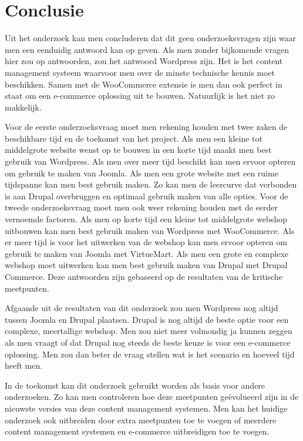 
\chapter{Conclusie}
\label{ch:conclusie}


Uit het onderzoek kan men concluderen dat dit geen onderzoeksvragen zijn waar men een eenduidig antwoord kan op geven. Als men zonder bijkomende vragen hier zou op antwoorden, zou het antwoord Wordpress zijn. Het is het content management systeem waarvoor men over de minste technische kennis moet beschikken. Samen met de WooCommerce extensie is men dan ook perfect in staat om een e-commerce oplossing uit te bouwen. Natuurlijk is het niet zo makkelijk.

Voor de eerste onderzoeksvraag moet men rekening houden met twee zaken de beschikbare tijd en de toekomst van het project. Als men een kleine tot middelgrote website wenst op te bouwen in een korte tijd maakt men best gebruik van Wordpress. Als men over meer tijd beschikt kan men ervoor opteren om gebruik te maken van Joomla. Als men een grote website met een ruime tijdspanne kan men best gebruik maken. Zo kan men de leercurve dat verbonden is aan Drupal overbruggen en optimaal gebruik maken van alle opties. Voor de tweede onderzoeksvraag moet men ook weer rekening houden met de eerder vernoemde factoren. Als men op korte tijd een kleine tot middelgrote webshop uitbouwen kan men best gebruik maken van Wordpress met WooCommerce. Als er meer tijd is voor het uitwerken van de webshop kan men ervoor opteren om gebruik te maken van Joomla met VirtueMart. Als men een grote en complexe webshop moet uitwerken kan men best gebruik maken van Drupal met Drupal Commerce. Deze antwoorden zijn gebaseerd op de resultaten van de kritische meetpunten.

Afgaande uit de resultaten van dit onderzoek zou men Wordpress nog altijd tussen Joomla en Drupal plaatsen. Drupal is nog altijd de beste optie voor een complexe, meertallige webshop. Men zou niet meer volmondig ja kunnen zeggen als men vraagt of dat Drupal nog steeds de beste keuze is voor een e-commerce oplossing. Men zou dan beter de vraag stellen wat is het scenario en hoeveel tijd heeft men. 
 
In de toekomst kan dit onderzoek gebruikt worden als basis voor andere onderzoeken. Zo kan men controleren hoe deze meetpunten geëvolueerd zijn in de nieuwste versies van deze content management systemen. Men kan het huidige onderzoek ook uitbreiden door extra meetpunten toe te voegen of meerdere content management systemen en e-commerce uitbreidigen toe te voegen.